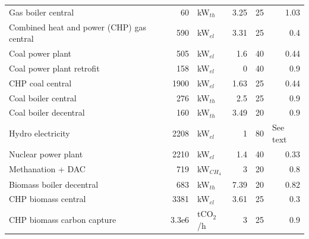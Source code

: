 \documentclass[preprint,12pt]{elsarticle}
\begin{document}
\begin{table}[htbp]
\begin{tabular}{lrlrrr}
    Gas boiler central                        & 60                                                                                          & kW$_{th}$ & 3.25 & 25 & 1.03 \\
    Combined heat and power (CHP) gas central & 590                                                                                         & kW$_{el}$ & 3.31 & 25 & 0.4 \\
    Coal power plant                          & 505                                                                                         & kW$_{el}$ & 1.6  & 40 & 0.44 \\
    Coal power plant retrofit                 & 158                                                                                         & kW$_{el}$ & 0    & 40 & 0.9 \\
    CHP coal central                          & 1900                                                                                        & kW$_{el}$ & 1.63 & 25 & 0.44 \\
    Coal boiler central                       & 276                                                                                         & kW$_{th}$ & 2.5  & 25 & 0.9 \\
    Coal boiler decentral                     & 160                                                                                         & kW$_{th}$ & 3.49 & 20 & 0.9 \\
    Hydro electricity                         & 2208                                                                                        & kW$_{el}$ & 1    & 80 & \multicolumn{1}{l}{See text} \\
    Nuclear power plant                       & 2210                                                                                        & kW$_{el}$ & 1.4  & 40 & 0.33 \\
    Methanation + DAC                         & 719                                                                                         & kW$_{CH_4}$ & 3 & 20 & 0.8 \\
    Biomass boiler decentral                  & 683                                                                                         & kW$_{th}$ & 7.39 & 20 & 0.82 \\
    CHP biomass central                       & 3381                                                                                        & kW$_{el}$ & 3.61 & 25 & 0.3 \\
    CHP biomass carbon capture                & 3.3e6                                                                                       & tCO$_2$/h & 3 & 25 & 0.9 \\

\end{tabular}
\end{table}
\end{document}
